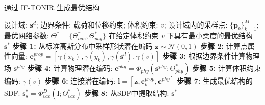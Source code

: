 \begin{algorithm}[htbp]
    \caption{通过 IF-TONIR 生成最优结构}
    \label{alg:algorithm2}
    \begin{algorithmic}[1]
        \REQUIRE 设计域: $\mathbf{s}^d$; 边界条件: 载荷和位移约束; 体积约束: $v$; 设计域内的采样点: $\{\mathbf{p}_k\}_{k=1}^M$; 最优网络参数: $\Theta^*=\{\Theta^*_{vae}, \Theta^*_{phy}\}$
        \ENSURE 在给定体积约束 $v$ 下具有最小柔度的最优结构 $\mathbf{s}^*$
        \STATE \textbf{步骤 1:} 从标准高斯分布中采样形状潜在编码 $\mathbf{z}\sim\mathcal{N}(0, 1)$
        \STATE \textbf{步骤 2:} 计算点属性向量: $\mathbf{c}^{prop}_{k}=[\gamma(x_k),\gamma(y_k),\gamma(\mathbf{s}^{d}),\gamma(v)]$
        \STATE \textbf{步骤 3:} 根据边界条件计算物理场 $\mathbf{s}^{phy}$
        \STATE \textbf{步骤 4:} 计算物理潜在编码: $\mathbf{c}^{phy}=\Phi_{phy}(\mathbf{s}^{phy}; \Theta^*_{phy})$
        \STATE \textbf{步骤 5:} 计算体积约束编码: $\gamma(v)$
        \STATE \textbf{步骤 6:} 连接潜在编码: $\mathbf{l}=[\mathbf{z}, \mathbf{c}^{prop}_k, \mathbf{c}^{phy}]$
        \STATE \textbf{步骤 7:} 生成最优结构的SDF: $\mathbf{s}_s^*=\Phi^D_{vae}(\mathbf{l}; \Theta^*_{vae})$
        \STATE \textbf{步骤 8:} 从SDF中提取结构: $\mathbf{s}^*$
    \end{algorithmic}
\end{algorithm}